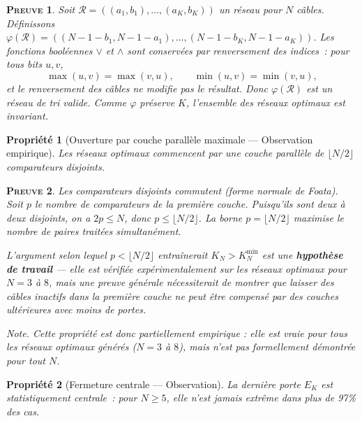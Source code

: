 \documentclass[11pt,a4paper]{article}
\theoremstyle{propretheoreme}
\newtheorem{propriete}{Propriété}
\theoremstyle{proprepreuve}
\newtheorem*{preuve}{\small\textsc{Preuve}}
\theoremstyle{proprecorollaire}
\begin{document}
\begin{preuve}
Soit $\mathcal{R} = ((a_1,b_1),\dots,(a_K,b_K))$ un réseau pour $N$ câbles. Définissons $\varphi(\mathcal{R}) = ((N-1-b_1,N-1-a_1),\dots,(N-1-b_K,N-1-a_K))$. Les fonctions booléennes $\lor$ et $\land$ sont conservées par renversement des indices~: pour tous bits $u,v$,
\[
\max(u,v) = \max(v,u),\qquad \min(u,v) = \min(v,u),
\]
et le renversement des câbles ne modifie pas le résultat. Donc $\varphi(\mathcal{R})$ est un réseau de tri valide. Comme $\varphi$ préserve $K$, l'ensemble des réseaux optimaux est invariant.
\end{preuve}

\begin{propriete}[Ouverture par couche parallèle maximale --- Observation empirique]\label{p4}
Les réseaux optimaux commencent par une couche parallèle de $\lfloor N/2\rfloor$ comparateurs disjoints.
\end{propriete}

\begin{preuve}
Les comparateurs disjoints commutent (forme normale de Foata). Soit $p$ le nombre de comparateurs de la première couche. Puisqu'ils sont deux à deux disjoints, on a $2p \le N$, donc $p \le \lfloor N/2\rfloor$. La borne $p = \lfloor N/2\rfloor$ maximise le nombre de paires traitées simultanément.

L'argument selon lequel $p < \lfloor N/2\rfloor$ entraînerait $K_N > K_N^{\text{min}}$ est une \textbf{hypothèse de travail} — elle est vérifiée expérimentalement sur les réseaux optimaux pour $N=3$ à $8$, mais une preuve générale nécessiterait de montrer que laisser des câbles inactifs dans la première couche ne peut être compensé par des couches ultérieures avec moins de portes.

\textit{Note.} Cette propriété est donc partiellement empirique : elle est vraie pour tous les réseaux optimaux générés ($N=3$ à $8$), mais n'est pas formellement démontrée pour tout $N$.
\end{preuve}

\begin{propriete}[Fermeture centrale --- Observation]\label{p5}
La dernière porte $E_K$ est statistiquement centrale~: pour $N\ge5$, elle n'est jamais extrême dans plus de 97\% des cas.
\end{propriete}
\end{document}
